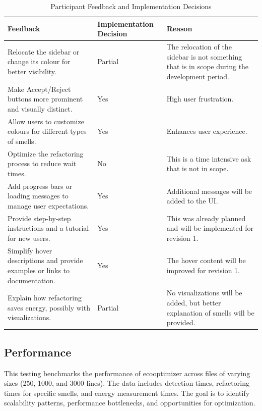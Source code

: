 \documentclass[12pt, titlepage]{article}
\begin{document}
\begin{table}[H]
  \centering
  \begin{tabular}{>{\raggedright\arraybackslash}p{6cm}p{3.2cm}>{\raggedright\arraybackslash}p{5cm}}
    \toprule \textbf{Feedback} & \textbf{Implementation Decision} &
    \textbf{Reason} \\
    \midrule
    Relocate the sidebar or change its colour for better visibility.
    & Partial & The relocation of the sidebar is not something that
    is in scope during the development period. \\
    Make Accept/Reject buttons more prominent and visually distinct.
    & Yes & High user frustration. \\
    Allow users to customize colours for different types of smells. &
    Yes & Enhances user experience. \\
    Optimize the refactoring process to reduce wait times. & No &
    This is a time intensive ask that is not in scope. \\
    Add progress bars or loading messages to manage user
    expectations. & Yes & Additional messages will be added to the UI.\\
    Provide step-by-step instructions and a tutorial for new users. &
    Yes & This was already planned and will be implemented for revision 1. \\
    Simplify hover descriptions and provide examples or links to
    documentation. & Yes & The hover content will be improved for revision 1. \\
    Explain how refactoring saves energy, possibly with
    visualizations. & Partial & No visualizations will be added, but
    better explanation of smells will be provided. \\
    \bottomrule
  \end{tabular}
  \caption{Participant Feedback and Implementation Decisions}
\end{table}

\subsection{Performance}

This testing benchmarks the performance of ecooptimizer across
files of varying sizes (250, 1000, and 3000 lines). The data includes
detection times, refactoring times for specific smells, and energy measurement times.
The goal is to identify scalability patterns, performance bottlenecks, and
opportunities for optimization.\\
\end{document}
